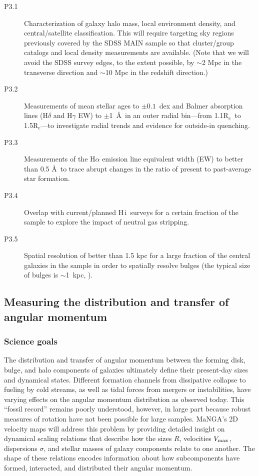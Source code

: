 \documentclass[preprint,11pt]{aastex}
\newcommand{\Reff}{{R$_{e}$}}
\newcommand{\HI}{{\sc H\,i}}
\begin{document}
\begin{description}

\item[P3.1] Characterization of galaxy halo mass, local environment
  density, and central/satellite classification.  This will require
  targeting sky regions previously covered by the SDSS MAIN sample so
  that cluster/group catalogs and local density measurements are
  available.  (Note that we will avoid the SDSS survey edges, to the
  extent possible, by $\sim$2 Mpc in the transverse direction and
  $\sim$10 Mpc in the redshift direction.)

\item[P3.2] Measurements of mean stellar ages to $\pm0.1$~dex and Balmer absorption lines (H$\delta$ and H$\gamma$ EW) to $\pm$1~\AA\ in an outer radial bin---from 1.1\Reff\ to 1.5\Reff---to investigate
  radial trends and evidence for outside-in quenching.

\item[P3.3] Measurements of the H$\alpha$ emission line equivalent
  width (EW) to better than 0.5 \AA\ to trace abrupt changes in the
  ratio of present to past-average star formation.

\item[P3.4] Overlap with current/planned \HI\ surveys for a certain
fraction of the sample to explore the impact of neutral gas stripping.

\item[P3.5] Spatial resolution of better than 1.5 kpc for a large
  fraction of the central galaxies in the sample in order to spatially
  resolve bulges (the typical size of bulges is $\sim$1~kpc, \citealt{fisher2010}).


\end{description}


\subsection{Measuring the distribution and transfer of angular momentum}
\label{sec:dyn_scaling}

\subsubsection{Science goals}

The distribution and transfer of angular momentum between the forming
disk, bulge, and halo components of galaxies ultimately define their
present-day sizes and dynamical states.  Different formation channels
from dissipative collapse to fueling by cold streams, as well as tidal
forces from mergers or instabilities, have varying effects on the
angular momentum distribution as observed today.  This ``fossil
record'' remains poorly understood, however, in large part because
robust measures of rotation have not been possible for large samples.
MaNGA's 2D velocity maps will address this problem by providing
detailed insight on dynamical scaling relations that describe how the
sizes $R$, velocities $V_{\rm max}$, dispersions $\sigma$, and
stellar masses of galaxy components relate to one another.  The shape
of these relations encodes information about how subcomponents have
formed, interacted, and distributed their angular momentum. 
\end{document}
